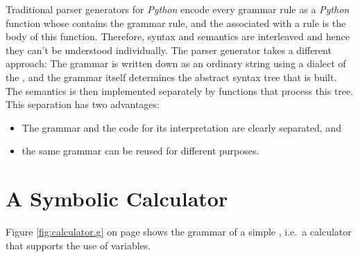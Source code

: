 \remarkEng
Traditional parser generators for \textsl{Python} encode every grammar rule as a \textsl{Python}
function whose  contains the grammar rule, and the
 associated with a 
rule is the body of this function.  Therefore, syntax and semantics are interleaved and hence they can't be
understood individually.  The parser generator 
takes a different approach:  The grammar is written down as an ordinary string using a dialect of the
 , and the grammar itself determines the abstract syntax tree
that is built.  The semantics is then implemented separately by functions that process this tree.  This
separation has two advantages:
\begin{itemize}
\item The grammar and the code for its interpretation are clearly separated, and 
\item the same grammar can be reused for different purposes.  \eox
\end{itemize}



\section{A Symbolic Calculator  \label{section:calculator}}
Figure \ref{fig:calculator.g} on page \pageref{fig:calculator.g} shows the grammar of a simple 
, i.e.~a calculator that supports the use of variables.  

